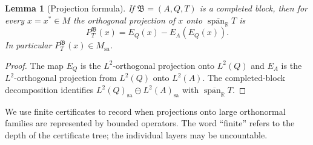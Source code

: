 \documentclass[11pt,letterpaper,reqno]{amsart}
\newtheorem{lem}[thm]{Lemma}
\theoremstyle{definition}
\numberwithin{equation}{section}
\newcommand{\sa}{\mathrm{sa}}
\newcommand{\RR}{\mathbb R}
\DeclareMathOperator{\spanop}{span}
\begin{document}
\begin{lem}[Projection formula]\label{lem:block-projection}
If $\mathfrak B=(A,Q,T)$ is a completed block, then for every $x=x^*\in M$ the orthogonal projection of $x$ onto $\overline{\spanop_{\RR}}T$ is
\[
   P_T^{\mathfrak B}(x)=E_Q(x)-E_A(E_Q(x)).
\]
In particular $P_T^{\mathfrak B}(x)\in M_{\sa}$.
\end{lem}

\begin{proof}
The map $E_Q$ is the $L^2$-orthogonal projection onto $L^2(Q)$ and $E_A$ is the $L^2$-orthogonal projection from $L^2(Q)$ onto $L^2(A)$.  The completed-block decomposition identifies $L^2(Q)_{\sa}\ominus L^2(A)_{\sa}$ with $\overline{\spanop_{\RR}}T$.
\end{proof}

We use finite certificates to record when projections onto large orthonormal families are represented by bounded operators.  The word ``finite'' refers to the depth of the certificate tree; the individual layers may be uncountable.
\end{document}
